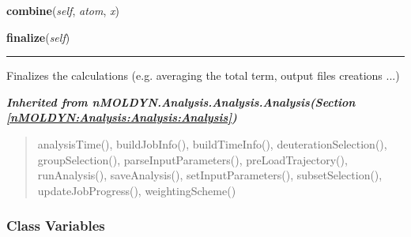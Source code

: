     \vspace{0.5ex}

\hspace{.8\funcindent}\begin{boxedminipage}{\funcwidth}

    \raggedright \textbf{combine}(\textit{self}, \textit{atom}, \textit{x})

\setlength{\parskip}{2ex}
\setlength{\parskip}{1ex}
    \end{boxedminipage}

    \label{nMOLDYN:Analysis:Dynamics:RootMeanSquareDeviation:finalize}

    \vspace{0.5ex}

\hspace{.8\funcindent}\begin{boxedminipage}{\funcwidth}

    \raggedright \textbf{finalize}(\textit{self})

    \vspace{-1.5ex}

    \rule{\textwidth}{0.5\fboxrule}
\setlength{\parskip}{2ex}
    Finalizes the calculations (e.g. averaging the total term, output files
    creations ...)

\setlength{\parskip}{1ex}
    \end{boxedminipage}


\large{\textbf{\textit{Inherited from nMOLDYN.Analysis.Analysis.Analysis\textit{(Section \ref{nMOLDYN:Analysis:Analysis:Analysis})}}}}

\begin{quote}
analysisTime(), buildJobInfo(), buildTimeInfo(), deuterationSelection(), groupSelection(), parseInputParameters(), preLoadTrajectory(), runAnalysis(), saveAnalysis(), setInputParameters(), subsetSelection(), updateJobProgress(), weightingScheme()
\end{quote}


  \subsubsection{Class Variables}

